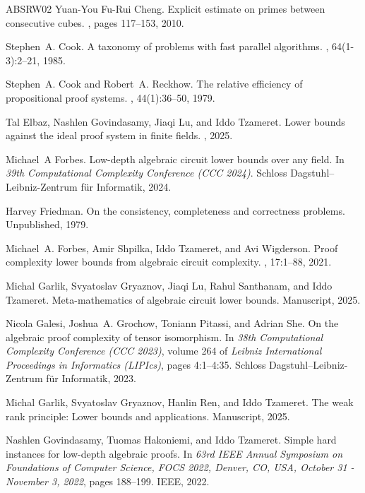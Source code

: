 \documentclass[11pt,letter]{article}
\theoremstyle{remark} %
\let\etalchar\relax %
\begin{document}
{\begin{thebibliography}{ABSRW02}
Yuan-You Fu-Rui Cheng.
\newblock Explicit estimate on primes between consecutive cubes.
, pages 117--153, 2010.

Stephen~A. Cook.
\newblock A taxonomy of problems with fast parallel algorithms.
, 64(1-3):2--21, 1985.

Stephen~A. Cook and Robert~A. Reckhow.
\newblock The relative efficiency of propositional proof systems.
, 44(1):36--50, 1979.

Tal Elbaz, Nashlen Govindasamy, Jiaqi Lu, and Iddo Tzameret.
\newblock Lower bounds against the ideal proof system in finite fields.
, 2025.

Michael~A Forbes.
\newblock Low-depth algebraic circuit lower bounds over any field.
\newblock In {\em 39th Computational Complexity Conference (CCC 2024)}. Schloss Dagstuhl--Leibniz-Zentrum f{\"u}r Informatik, 2024.

Harvey Friedman.
\newblock On the consistency, completeness and correctness problems.
\newblock Unpublished, 1979.

Michael~A. Forbes, Amir Shpilka, Iddo Tzameret, and Avi Wigderson.
\newblock Proof complexity lower bounds from algebraic circuit complexity.
, 17:1--88, 2021.

\bibitem[GGL{\etalchar{+}}25]{GGLST25}
Michal Garlik, Svyatoslav Gryaznov, Jiaqi Lu, Rahul Santhanam, and Iddo Tzameret.
\newblock Meta-mathematics of algebraic circuit lower bounds.
\newblock Manuscript, 2025.

Nicola Galesi, Joshua~A. Grochow, Toniann Pitassi, and Adrian She.
\newblock On the algebraic proof complexity of tensor isomorphism.
\newblock In {\em 38th Computational Complexity Conference (CCC 2023)}, volume 264 of {\em Leibniz International Proceedings in Informatics (LIPIcs)}, pages 4:1--4:35. Schloss Dagstuhl--Leibniz-Zentrum f{\"u}r Informatik, 2023.

Michal Garlik, Svyatoslav Gryaznov, Hanlin Ren, and Iddo Tzameret.
\newblock The weak rank principle: Lower bounds and applications.
\newblock Manuscript, 2025.

Nashlen Govindasamy, Tuomas Hakoniemi, and Iddo Tzameret.
\newblock Simple hard instances for low-depth algebraic proofs.
\newblock In {\em 63rd {IEEE} Annual Symposium on Foundations of Computer Science, {FOCS} 2022, Denver, CO, USA, October 31 - November 3, 2022}, pages 188--199. {IEEE}, 2022.


\end{thebibliography}}
\end{document}

